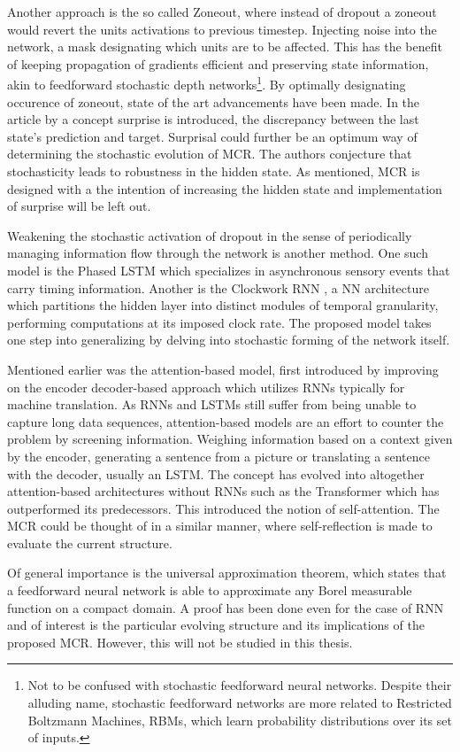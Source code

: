 Another approach is the so called Zoneout\cite{zoneo}, where instead of dropout a zoneout would revert the units activations to previous timestep. Injecting noise into the network, a mask designating which units are to be affected. This has the benefit of keeping propagation of gradients efficient and preserving state information, akin to feedforward stochastic depth networks\footnote{Not to be confused with stochastic feedforward neural networks. Despite their alluding name, stochastic feedforward networks are more related to Restricted Boltzmann Machines, RBMs, which learn probability distributions over its set of inputs.}. By optimally designating occurence of zoneout, state of the art advancements have been made\cite{Zoneout}. In the article by \textcite{Zoneout} a concept surprise is introduced, the discrepancy between the last state's prediction and target. Surprisal could further be an optimum way of determining the stochastic evolution of MCR. The authors \textcite{Zoneout} conjecture that stochasticity leads to robustness in the hidden state. As mentioned, MCR is designed with a the intention of increasing the hidden state and implementation of surprise will be left out.

Weakening the stochastic activation of dropout in the sense of periodically managing information flow through the network is another method. One such model is the Phased LSTM \cite{phaselstm} which specializes in asynchronous sensory events that carry timing information. Another is the Clockwork RNN \cite{Clockwork}, a NN architecture which partitions the hidden layer into distinct modules of temporal granularity, performing computations at its imposed clock rate. The proposed model takes one step into generalizing by delving into stochastic forming of the network itself.

Mentioned earlier was the attention-based model, first introduced by \textcite{att} improving on the encoder decoder-based approach which utilizes RNNs typically for machine translation. As RNNs and LSTMs still suffer from being unable to capture long data sequences, attention-based models are an effort to counter the problem by screening information. Weighing information based on a context given by the encoder, generating a sentence from a picture or translating a sentence with the decoder, usually an LSTM. The concept has evolved into altogether attention-based architectures without RNNs such as the Transformer\cite{trans} which has outperformed its predecessors. This introduced the notion of self-attention. The MCR could be thought of in a similar manner, where self-reflection is made to evaluate the current structure. 

Of general importance is the universal approximation theorem, which states that a feedforward neural network is able to approximate any Borel measurable function on a compact domain. A proof has been done even for the case of RNN \cite{uarnn} and of interest is the particular evolving structure and its implications of the proposed MCR. However, this will not be studied in this thesis.

